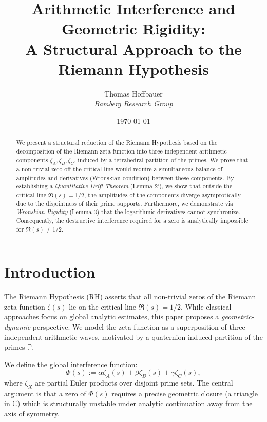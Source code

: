 \documentclass[a4paper,11pt]{article}
\title{\textbf{Arithmetic Interference and Geometric Rigidity: \\ A Structural Approach to the Riemann Hypothesis}}
\author{Thomas Hoffbauer \\ \textit{Bamberg Research Group}}
\date{\today}
\begin{document}
\maketitle

\begin{abstract}
\noindent
We present a structural reduction of the Riemann Hypothesis based on the decomposition of the Riemann zeta function into three independent arithmetic components $\zeta_A, \zeta_B, \zeta_C$, induced by a tetrahedral partition of the primes. We prove that a non-trivial zero off the critical line would require a simultaneous balance of amplitudes and derivatives (Wronskian condition) between these components. By establishing a \textit{Quantitative Drift Theorem} (Lemma 2'), we show that outside the critical line $\Re(s)=1/2$, the amplitudes of the components diverge asymptotically due to the disjointness of their prime supports. Furthermore, we demonstrate via \textit{Wronskian Rigidity} (Lemma 3) that the logarithmic derivatives cannot synchronize. Consequently, the destructive interference required for a zero is analytically impossible for $\Re(s) \neq 1/2$.
\end{abstract}

\tableofcontents

\section{Introduction}
The Riemann Hypothesis (RH) asserts that all non-trivial zeros of the Riemann zeta function $\zeta(s)$ lie on the critical line $\Re(s) = 1/2$. While classical approaches focus on global analytic estimates, this paper proposes a \textit{geometric-dynamic} perspective. We model the zeta function as a superposition of three independent arithmetic waves, motivated by a quaternion-induced partition of the primes $\mathbb{P}$.

We define the global interference function:
\begin{equation}
    \Phi(s) := \alpha \zeta_A(s) + \beta \zeta_B(s) + \gamma \zeta_C(s),
\end{equation}
where $\zeta_X$ are partial Euler products over disjoint prime sets. The central argument is that a zero of $\Phi(s)$ requires a precise geometric closure (a triangle in $\mathbb{C}$) which is structurally unstable under analytic continuation away from the axis of symmetry.
\end{document}

